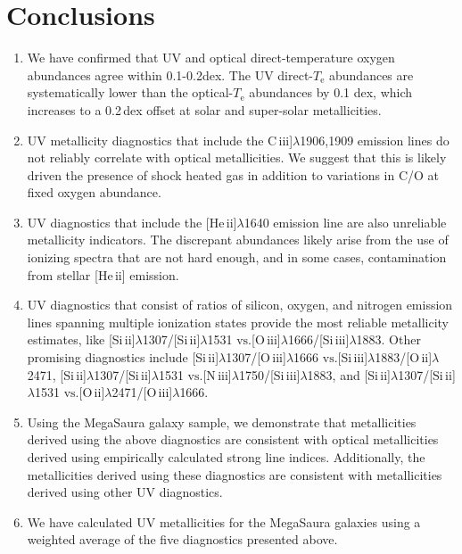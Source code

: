 \documentclass[preprint2]{aastex62}
\newcommand{\niii}{[N\,{\sc iii}]\xspace}
\newcommand{\oiii}{[O\,{\sc iii}]\xspace}
\newcommand{\oii}{[O\,{\sc ii}]\xspace}
\newcommand{\heii}{[He\,{\sc ii}]\xspace}
\newcommand{\SiuII}{[Si\,{\sc ii}]\xspace}
\newcommand{\SiuIII}{[Si\,{\sc iii}]\xspace}
\newcommand{\ciii}{C\,{\sc iii}]\xspace}
\newcommand\vs{\ensuremath{\mathrm{vs.}}\xspace}
\newcommand{\mage}{{\sc Meg}a{\sc S}a{\sc ura}\xspace}
\newcommand{\Te}{\ensuremath{T_{\mathrm{e}}}\xspace}
\begin{document}
\section{Conclusions}\label{sec:conclusions}
\begin{enumerate}
    \item We have confirmed that UV and optical direct-temperature oxygen abundances agree within 0.1-0.2dex. The UV direct-\Te abundances are systematically lower than the optical-\Te abundances by 0.1 dex, which increases to a 0.2\,dex offset at solar and super-solar metallicities.
    \item UV metallicity diagnostics that include the \ciii$\lambda$1906,1909 emission lines do not reliably correlate with optical metallicities. We suggest that this is likely driven the presence of shock heated gas in addition to variations in C/O at fixed oxygen abundance.
    \item UV diagnostics that include the \heii$\lambda$1640 emission line are also unreliable metallicity indicators. The discrepant abundances likely arise from the use of ionizing spectra that are not hard enough, and in some cases, contamination from stellar \heii emission.
    \item UV diagnostics that consist of ratios of silicon, oxygen, and nitrogen emission lines spanning multiple ionization states provide the most reliable metallicity estimates, like \SiuII$\lambda$1307/\SiuII$\lambda$1531 \vs \oiii$\lambda$1666/\SiuIII$\lambda$1883. Other promising diagnostics include \SiuII$\lambda$1307/\oiii$\lambda$1666 \vs \SiuIII$\lambda$1883/\oii$\lambda$2471, \SiuII$\lambda$1307/\SiuII$\lambda$1531 \vs \niii$\lambda$1750/\SiuIII$\lambda$1883, and \SiuII$\lambda$1307/\SiuII$\lambda$1531 \vs \oii$\lambda$2471/\oiii$\lambda$1666.
    \item Using the \mage galaxy sample, we demonstrate that metallicities derived using the above diagnostics are consistent with optical metallicities derived using empirically calculated strong line indices. Additionally, the metallicities derived using these diagnostics are consistent with metallicities derived using other UV diagnostics.
    \item We have calculated UV metallicities for the \mage galaxies using a weighted average of the five diagnostics presented above.
\end{enumerate}




\end{document}
